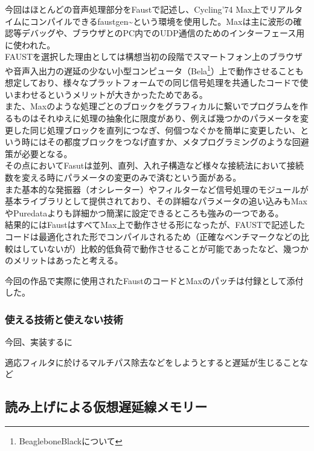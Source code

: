 今回はほとんどの音声処理部分をFaustで記述し、Cycling'74
Max上でリアルタイムにコンパイルできるfaustgen\textasciitilde{}という環境を使用した。Maxは主に波形の確認等デバッグや、ブラウザとのPC内でのUDP通信のためのインターフェース用に使われた。\\
FAUSTを選択した理由としては構想当初の段階でスマートフォン上のブラウザや音声入出力の遅延の少ない小型コンピュータ（Bela\footnote{BeagleboneBlackについて}）上で動作させることも想定しており、様々なプラットフォームでの同じ信号処理を共通したコードで使いまわせるというメリットが大きかったためである。\\
また、Maxのような処理ごとのブロックをグラフィカルに繋いでプログラムを作るものはそれゆえに処理の抽象化に限度があり、例えば幾つかのパラメータを変更した同じ処理ブロックを直列につなぎ、何個つなぐかを簡単に変更したい、という時にはその都度ブロックをつなげ直すか、メタプログラミングのような回避策が必要となる。\\
その点においてFasutは並列、直列、入れ子構造など様々な接続法において接続数を変える時にパラメータの変更のみで済むという面がある。\\
また基本的な発振器（オシレーター）やフィルターなど信号処理のモジュールが基本ライブラリとして提供されており、その詳細なパラメータの追い込みもMaxやPuredataよりも詳細かつ簡潔に設定できるところも強みの一つである。\autocites[
]{Orlarey2004faust}{smith2012signal}\\
結果的にはFaustはすべてMax上で動作させる形になったが、FAUSTで記述したコードは最適化された形でコンパイルされるため（正確なベンチマークなどの比較はしていないが）比較的低負荷で動作させることが可能であったなど、幾つかのメリットはあったと考える。

今回の作品で実際に使用されたFaustのコードとMaxのパッチは付録として添付した。

\subsubsection{使える技術と使えない技術}\label{ux4f7fux3048ux308bux6280ux8853ux3068ux4f7fux3048ux306aux3044ux6280ux8853}

今回、実装するに

適応フィルタに於けるマルチパス除去などをしようとすると遅延が生じることなど

\subsection{読み上げによる仮想遅延線メモリー}\label{ux8aadux307fux4e0aux3052ux306bux3088ux308bux4eeeux60f3ux9045ux5ef6ux7ddaux30e1ux30e2ux30eaux30fc}

